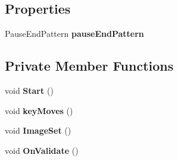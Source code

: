 \subsection*{Properties}
\begin{DoxyCompactItemize}
\item 
\mbox{\label{class_game_pause_u_i_aadc6a508a82036249b13b8fce57eccc4}} 
Pause\+End\+Pattern {\bfseries pause\+End\+Pattern}
\end{DoxyCompactItemize}
\subsection*{Private Member Functions}
\begin{DoxyCompactItemize}
\item 
\mbox{\label{class_game_pause_u_i_a839ac5c72ebc7a375de171e9a5ee40a5}} 
void {\bfseries Start} ()
\item 
\mbox{\label{class_game_pause_u_i_acfa9c963560c14cd24402fdc161054ff}} 
void {\bfseries key\+Moves} ()
\item 
\mbox{\label{class_game_pause_u_i_a096cc950f1059fdda318ca69a808f620}} 
void {\bfseries Image\+Set} ()
\item 
\mbox{\label{class_game_pause_u_i_ad3add4e2a15eebfdad0eeedb3059d611}} 
void {\bfseries On\+Validate} ()
\end{DoxyCompactItemize}
